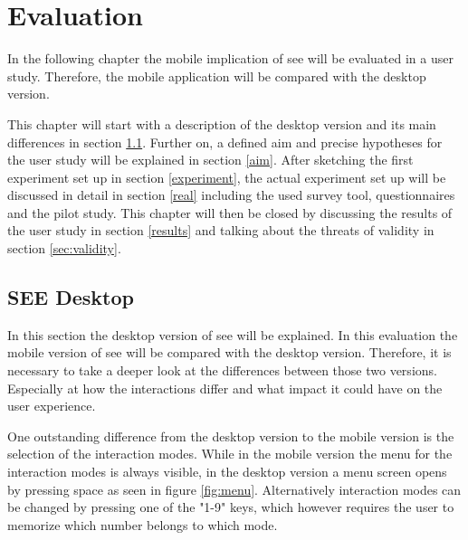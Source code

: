 \section{Evaluation}
\label{section:evaluation}
In the following chapter the mobile implication of \gls{see} will be evaluated in a user study.
Therefore, the mobile application will be compared with the desktop version.

This chapter will start with a description of the desktop version and its main differences in section \ref{desktop}.
Further on, a defined aim and precise hypotheses for the user study will be explained in section \ref{aim}.
After sketching the first experiment set up in section \ref{experiment}, the actual experiment set up will be discussed in detail in section \ref{real} including the used survey tool, questionnaires and the pilot study.
This chapter will then be closed by discussing the results of the user study in section \ref{results} and talking about the threats of validity in section \ref{sec:validity}.
\subsection{SEE Desktop}
\label{desktop}
In this section the desktop version of \gls{see} will be explained.
In this evaluation the mobile version of \gls{see} will be compared with the desktop version.
Therefore, it is necessary to take a deeper look at the differences between those two versions.
Especially at how the interactions differ and what impact it could have on the user experience.

One outstanding difference from the desktop version to the mobile version is the selection of the interaction modes.
While in the mobile version the menu for the interaction modes is always visible, in the desktop version a menu screen opens by pressing space as seen in figure \ref{fig:menu}.
Alternatively interaction modes can be changed by pressing one of the "1-9" keys, which however requires the user to memorize which number belongs to which mode.

